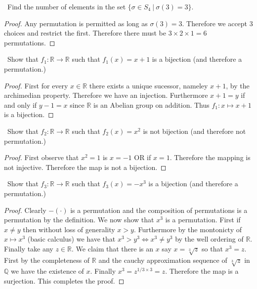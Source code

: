 \documentclass[11pt]{amsart}
\begin{document}
\medskip {}\ Find the number of elements in the set $\{\sigma \in S_4 \ |\  \sigma(3)=3\}$.
\begin{proof}
	Any permutation is permitted as long as $\sigma(3) = 3.$ Therefore we accept 3 choices and restrict the first. Therefore there must be $3 \times 2 \times 1 = 6$ permutations.
\end{proof}
\medskip {}\ Show that $f_1 : \mathbb{R} \to \mathbb{R}$ such that $f_1(x)  = x + 1$ is a bijection (and therefore a permutation.)
\begin{proof}
	First for every $x \in \mathbb{R}$ there exists a unique sucessor, nameley $x+ 1$, by the archimedian property. Therefore we have an injection. Furthermore $x + 1 =y$ if and only if $y -1 = x$ since $\mathbb{R}$ is an Abelian group on addition. Thus $f_1: x \mapsto x+1$ is a bijection.
\end{proof}
\medskip {}\ Show that $f_2 : \mathbb{R} \to \mathbb{R}$ such that $f_2(x)  = x^2$ is not bijection (and therefore not permutation.)
\begin{proof}
	First observe that $x^2 = 1$ is $x = -1$ OR if $x=1$. Therefore the mapping is not injective. Therefore the map is not a bijection.
\end{proof}
\medskip {}\  Show that $f_3 : \mathbb{R} \to \mathbb{R}$ such that $f_3(x)  = -x^3$ is a bijection (and therefore a permutation.)
\begin{proof}	
	Clearly $-(\cdot)$ is a permutation and the composition of permutations is a permutation by the definition. We now show that $x^3$ is a permutation. 
	First if $x \neq y$ then without loss of generality $x > y$. Furthermore by the montonicty of $x \mapsto x^3$ (basic calculus) we have that $x^3 > y^3 \iff x^3 \neq y^3$ by the well ordering of $\mathbb{R}.$ Finally take any $z \in \mathbb{R}$. We claim that there is an $x$ say $x = \sqrt[3]{z}$ so that $x^3 = z.$ First by the completeness of $\mathbb{R}$ and the cauchy approximation sequence of $\sqrt[3]{z}$ in $\mathbb{Q}$ we have the existence of $x.$ Finally $x^3 = z^{1/3\times 3} = z.$ Therefore the map is a surjection. This completes the proof.
\end{proof}
\end{document}
